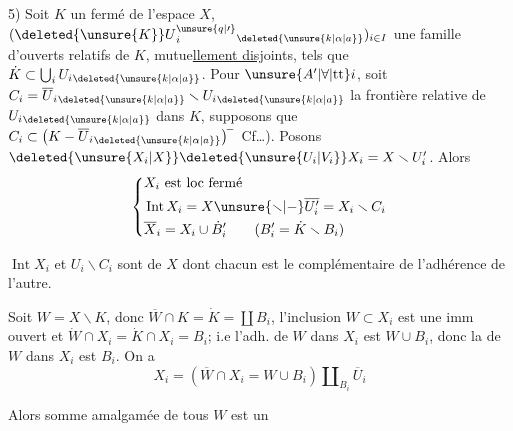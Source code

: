 
5) Soit $K$ un fermé de l'espace $X$, $(\deleted{\unsure{K}}U{}^{\unsure{q|\prime}}_i{}_{\deleted{\unsure{k|\alpha|a}}})_{i\in I}$ une famille d'ouverts relatifs de $K$, mutue\uline{llement disj}oints, tels que $\dot K\subset\bigcup_i U_i{}_{\deleted{\unsure{k|\alpha|a}}}$.   Pour $\unsure{A'|\forall|\mathrm{tt}}i$, soit $C_i=\overline U_i{}_{\deleted{\unsure{k|\alpha|a}}}\smallsetminus U_i{}_{\deleted{\unsure{k|\alpha|a}}}$ la frontière relative de $U_i{}_{\deleted{\unsure{k|\alpha|a}}}$ dans $K$, supposons que $C_i\subset\bigl(K-\overline U_i{}_{\deleted{\unsure{k|\alpha|a}}}\bigr)^{\! -}$ Cf\ldots). Posons $\deleted{\unsure{X_i|X}}\deleted{\unsure{U_i|V_i}}X_i=X\smallsetminus U'_i$. Alors
\[
\left\{\begin{aligned}
&X_i\ \text{est loc fermé}\\
&\operatorname{Int}X_i=X\unsure{\smallsetminus|-}\overline{U'_i}=X_i\smallsetminus C_i\\
&\overline X_i=X_i\cup \dot B'_i\qquad(B'_i=\dot K\smallsetminus B_i)
\end{aligned}\right.
\]

$\operatorname{Int}X_i$ et \uline{$U_i\smallsetminus C_i$} sont   de $X$ dont chacun est le complémentaire de l'adhérence de l'autre.

Soit $W=X\smallsetminus K$,  donc  $\overline W\cap K=\dot K=\coprod B_i$, l'inclusion $W\subset X_i$ est une imm ouvert et $\dot W\cap X_i=\dot K\cap X_i=B_i$;  i.e  l'adh. de $W$ dans $X_i$ est $W\cup B_i$, donc la  de $W$ dans $X_i$ est $B_i$. On a
\[
X_i=(\overline W\cap X_i=W\cup B_i)\amalg_{B_i}\overline U_i
\]


Alors  somme amalgamée de tous    $W$ est un 
